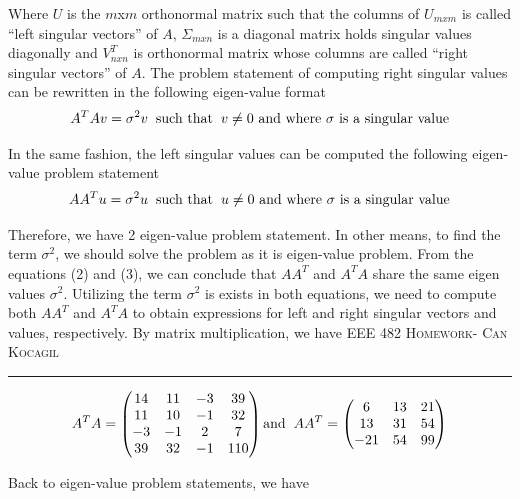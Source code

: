 \documentclass[12pt]{amsart}
\begin{document}
Where $U$ is the $m$x$m$ orthonormal matrix such that the columns of $U_{mxm}$ is called “left singular vectors” of $A$, $\Sigma_{mxn}$ is a diagonal matrix holds singular values diagonally and $V_{nxn}^T$ is orthonormal matrix whose columns are called “right singular vectors” of $A$. The problem statement of computing right singular values can be rewritten in the following eigen-value format
\begin{equation}
    A^T A v = \sigma^2v \hspace{2mm} \text{such that} \hspace{2mm} v \neq  0 \text{ and where $\sigma$ is a singular value} 
\end{equation}

In the same fashion, the left singular values can be computed the following eigen-value problem statement
\begin{equation}
    AA^T u = \sigma^2u \hspace{2mm} \text{such that} \hspace{2mm} u \neq  0 \text{ and where $\sigma$ is a singular value} 
\end{equation}

Therefore, we have 2 eigen-value problem statement. In other means, to find the term $\sigma^2$, we should solve the problem as it is eigen-value problem. From the equations (2) and (3), we can conclude that $AA^T$ and $A^TA$ share the same eigen values $\sigma^2$. Utilizing the term  $\sigma^2$ is exists in both equations, we need to compute both  $AA^T$ and $A^TA$ to obtain expressions for left and right singular vectors and values, respectively. By matrix multiplication, we have
\newpage
{\scshape EEE 482} \hfill {\scshape \large  Homework-\relax} \hfill {\scshape Can Kocagil}
\smallskip
\hrule
\vspace{2mm}
\[ A^TA =
\begin{pmatrix}
  14 & 11 & -3& 39\\
  11 & 10 & -1& 32\\
  -3 &-1 & 2& 7 \\
  39& 32& -1& 110
\end{pmatrix} \text{and}\hspace{2mm}
AA^T =
\begin{pmatrix}
  6 & 13 & 21\\
  13 & 31 & 54\\
  -21 & 54 & 99 
\end{pmatrix}
\]


Back to eigen-value problem statements, we have
\end{document}
